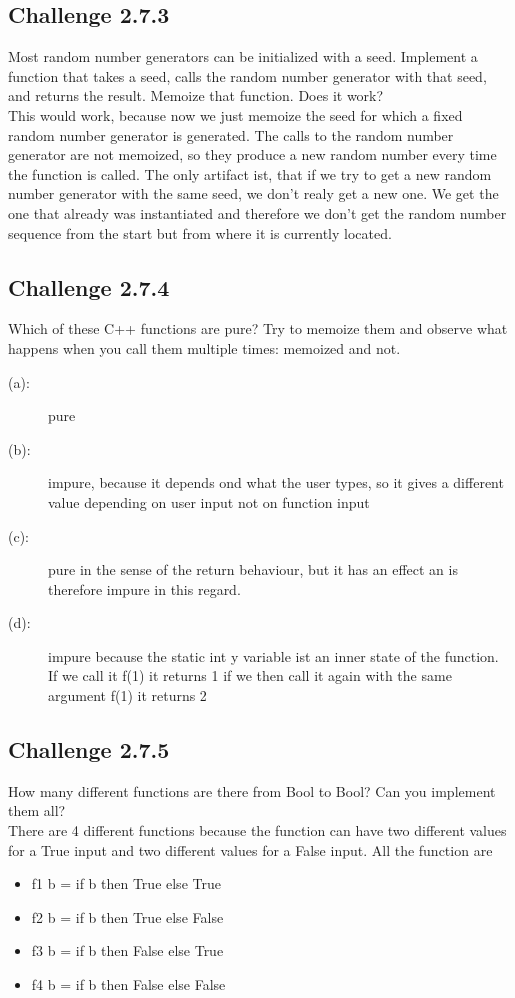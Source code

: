 \documentclass[11pt]{article}
\begin{document}
    \subsection*{Challenge 2.7.3}
        Most random number generators can be initialized with a seed.
        Implement a function that takes a seed, calls the random number
        generator with that seed, and returns the result. Memoize that
        function. Does it work?\\
        This would work, because now we just memoize the seed for which a fixed random number generator is generated. The calls to the random number generator are not memoized, so they produce a new random number every time the function is called. The only artifact ist, that if we try to get a new random number generator with the same seed, we don't realy get a new one. We get the one that already was instantiated and therefore we don't get the random number sequence from the start but from where it is currently located.

    \subsection*{Challenge 2.7.4}
        Which of these C++ functions are pure? Try to memoize them
        and observe what happens when you call them multiple times:
        memoized and not.\\
        \begin{description}
            \item[(a):] pure
            \item[(b):] impure, because it depends ond what the user types, so it gives a different value depending on user input not on function input
            \item[(c):] pure in the sense of the return behaviour, but it has an effect an is therefore impure in this regard.
            \item[(d):] impure because the static int y variable ist an inner state of the function. If we call it f(1) it returns 1 if we then call it again with the same argument f(1) it returns 2
        \end{description}

    \subsection*{Challenge 2.7.5}
        How many different functions are there from Bool to Bool? Can
        you implement them all?\\
        There are 4 different functions because the function can have two different values for a True input and two different values for a False input. All the function are 
        \begin{itemize}
            \item f1 b = if b then True else True
            \item f2 b = if b then True else False
            \item f3 b = if b then False else True
            \item f4 b = if b then False else False
        \end{itemize}
\end{document}
